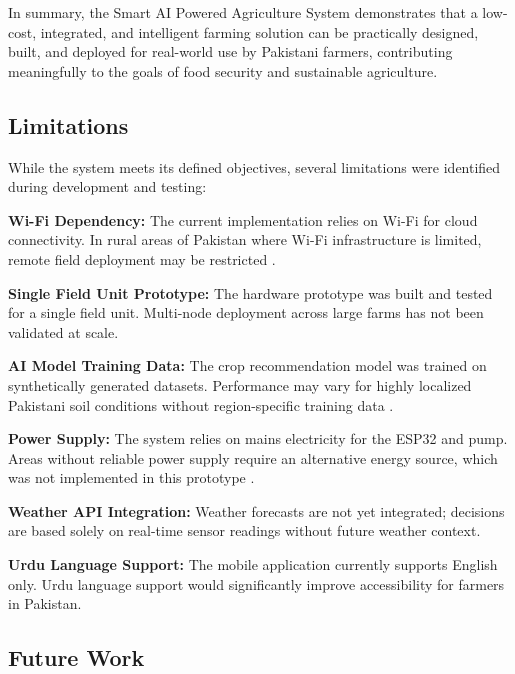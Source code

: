 In summary, the Smart AI Powered Agriculture System demonstrates 
that a low-cost, integrated, and intelligent farming solution can 
be practically designed, built, and deployed for real-world use 
by Pakistani farmers, contributing meaningfully to the goals of 
food security and sustainable agriculture.

\subsection{Limitations}

While the system meets its defined objectives, several limitations 
were identified during development and testing:

\textbf{Wi-Fi Dependency:} The current implementation relies on Wi-Fi for cloud connectivity. In rural areas of Pakistan where Wi-Fi infrastructure is limited, remote field deployment may be restricted \cite{mansoor2025iot}.

\textbf{Single Field Unit Prototype:} The hardware prototype was built and tested for a single field unit. Multi-node deployment across large farms has not been validated at scale.

\textbf{AI Model Training Data:} The crop recommendation model was trained on synthetically generated datasets. Performance may vary for highly localized Pakistani soil conditions without region-specific training data \cite{ali2025soilml}.

\textbf{Power Supply:} The system relies on mains electricity for the ESP32 and pump. Areas without reliable power supply require an alternative energy source, which was not implemented in this prototype \cite{khalifeh2024solar}.

\textbf{Weather API Integration:} Weather forecasts are not yet integrated; decisions are based solely on real-time sensor readings without future weather context.

\textbf{Urdu Language Support:} The mobile application currently supports English only. Urdu language support would significantly improve accessibility for farmers in Pakistan.



\subsection{Future Work}

